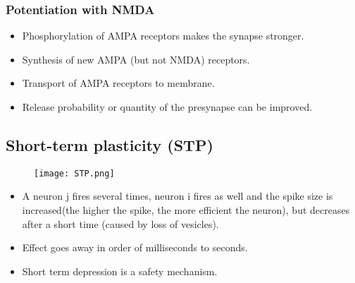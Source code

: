 \documentclass[main]{subfiles}
\begin{document}
\subsubsection{Potentiation with NMDA}
\begin{itemize}[noitemsep,nolistsep]
	\item Phosphorylation of AMPA receptors makes the synapse stronger.
	\item Synthesis of new AMPA (but not NMDA) receptors.
	\item Transport of AMPA receptors to membrane.
	\item Release probability or quantity of the presynapse can be improved.
\end{itemize}

\subsection{Short-term plasticity (STP)}
\begin{figure}[H]
	\texttt{[image: STP.png]}
\end{figure}
\begin{itemize}[noitemsep,nolistsep]
	\item A neuron j fires several times, neuron i fires as well and the spike size is increased(the higher the spike, the more efficient the neuron), but decreases after a short time (caused by loss of vesicles).
	\item Effect goes away in order of milliseconds to seconds.
	\item Short term depression is a safety mechanism.
\end{itemize}
\end{document}
